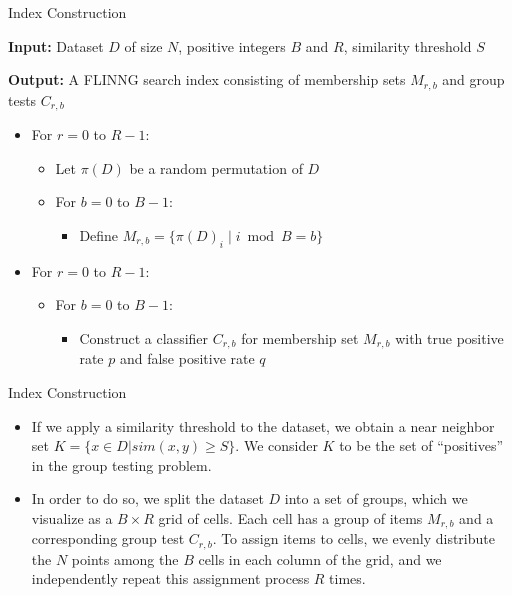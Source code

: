 \documentclass[Serif, 10pt, brown]{beamer}
\theoremstyle{example}
\theoremstyle{plain}
\begin{document}
\begin{frame}{Index Construction}

\textbf{Input:} Dataset $D$ of size $N$, positive integers $B$ and $R$, similarity threshold $S$

\textbf{Output:} A FLINNG search index consisting of membership sets $M_{r,b}$ and group tests $C_{r,b}$

\begin{itemize}
    \item For $r = 0$ to $R - 1$:
    \begin{itemize}
        \item Let $\pi(D)$ be a random permutation of $D$
        \item For $b = 0$ to $B - 1$:
        \begin{itemize}
            \item Define $M_{r,b} = \{ \pi(D)_i \mid i \bmod B = b \}$
        \end{itemize}
    \end{itemize}
    
    \item For $r = 0$ to $R - 1$:
    \begin{itemize}
        \item For $b = 0$ to $B - 1$:
        \begin{itemize}
            \item Construct a classifier $C_{r,b}$ for membership set $M_{r,b}$ with true positive rate $p$ and false positive rate $q$
        \end{itemize}
    \end{itemize}
\end{itemize}
\end{frame}

\begin{frame}{Index Construction}
	\begin{itemize}
		\item If we apply a similarity
		threshold to the dataset, we obtain a near neighbor set $K= \{x \in D | sim(x,y) \geq S\}$. We consider $K$ to be the set of “positives” in the group testing problem.
		\item In order to do so, we split the dataset $D$ into a set of groups, which we visualize as a $B \times R$ grid
		of cells. Each cell has a group of items $M_{r,b}$ and a corresponding group test $C_{r,b}$. To assign items
		to cells, we evenly distribute the $N$ points among the $B$ cells in each column of the grid, and we independently repeat this assignment process $R$ times.
	\end{itemize}
\end{frame}
\end{document}
